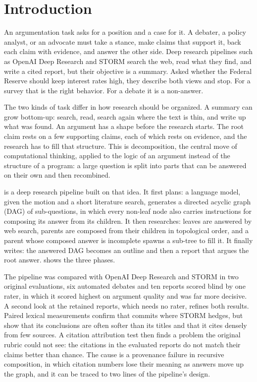\section{Introduction}
\label{sec:intro}

An argumentation task asks for a position and a case for it. A debater, a policy analyst, or an advocate must take a stance, make claims that support it, back each claim with evidence, and answer the other side. Deep research pipelines such as OpenAI Deep Research \citep{openai2025deepresearch} and STORM \citep{shao2024storm} search the web, read what they find, and write a cited report, but their objective is a summary. Asked whether the Federal Reserve should keep interest rates high, they describe both views and stop. For a survey that is the right behavior. For a debate it is a non-answer.

The two kinds of task differ in how research should be organized. A summary can grow bottom-up: search, read, search again where the text is thin, and write up what was found. An argument has a shape before the research starts. The root claim rests on a few supporting claims, each of which rests on evidence, and the research has to fill that structure. This is decomposition, the central move of computational thinking, applied to the logic of an argument instead of the structure of a program: a large question is split into parts that can be answered on their own and then recombined.

\sys{} is a deep research pipeline built on that idea. It first plans: a language model, given the motion and a short literature search, generates a directed acyclic graph (DAG) of sub-questions, in which every non-leaf node also carries instructions for composing its answer from its children. It then researches: leaves are answered by web search, parents are composed from their children in topological order, and a parent whose composed answer is incomplete spawns a sub-tree to fill it. It finally writes: the answered DAG becomes an outline and then a report that argues the root answer.  shows the three phases.

The pipeline was compared with OpenAI Deep Research and STORM in two original evaluations, six automated debates and ten reports scored blind by one rater, in which it scored highest on argument quality and was far more decisive. A second look at the retained reports, which needs no rater, refines both results. Paired lexical measurements confirm that \sys{} commits where STORM hedges, but show that its conclusions are often softer than its titles and that it cites densely from few sources. A citation attribution test then finds a problem the original rubric could not see: the citations in the evaluated reports do not match their claims better than chance. The cause is a provenance failure in recursive composition, in which citation numbers lose their meaning as answers move up the graph, and it can be traced to two lines of the pipeline's design.


